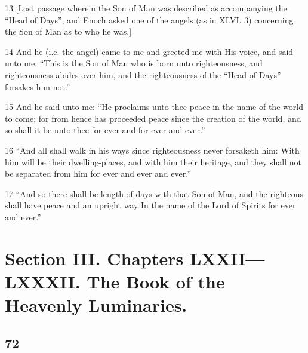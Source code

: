 \par 13 [Lost passage wherein the Son of Man was described as accompanying the “Head of Days”, and Enoch asked one of the angels (as in XLVI. 3) concerning the Son of Man as to who he was.]
\par 14 And he (i.e. the angel) came to me and greeted me with His voice, and said unto me: “This is the Son of Man who is born unto righteousness, and righteousness abides over him, and the righteousness of the “Head of Days” forsakes him not.”
\par 15 And he said unto me: “He proclaims unto thee peace in the name of the world to come; for from hence has proceeded peace since the creation of the world, and so shall it be unto thee for ever and for ever and ever.”
\par 16 “And all shall walk in his ways since righteousness never forsaketh him: With him will be their dwelling-places, and with him their heritage, and they shall not be separated from him for ever and ever and ever.”
\par 17 “And so there shall be length of days with that Son of Man, and the righteous shall have peace and an upright way In the name of the Lord of Spirits for ever and ever.”

\part {Section III. Chapters LXXII—LXXXII. The Book of the Heavenly Luminaries.}

\chapter{72}

